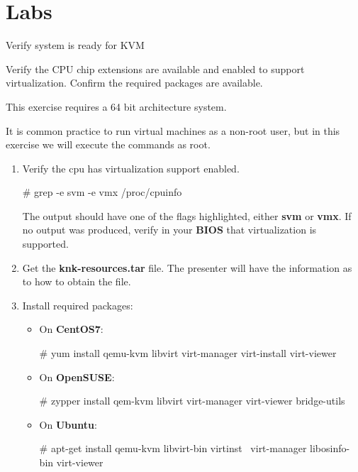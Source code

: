\clearpage\section{Labs}\begin{Lab}

\begin{exe} {Verify system is ready for KVM }

   Verify the CPU chip extensions are available and enabled to support virtualization. 
   Confirm the required packages are available. 

   This exercise requires a 64 bit architecture system.

   It is common practice to run virtual machines as a non-root user, but in this
   exercise we will execute the commands as root.

   \begin{sol}
      \begin{enumerate}
         \item	Verify the cpu has virtualization support enabled.
		 \begin{raw}
# grep -e svm -e vmx /proc/cpuinfo 
		\end{raw} 
		      The output should have one of the flags highlighted, either 
		      \textbf{svm} or \textbf{vmx}. If no output was produced, verify 
		      in your \textbf{BIOS} that virtualization is supported. 
		  
	\item Get the \textbf{knk-resources.tar} file. The presenter will 
		have the information as to how to obtain the file. 
	  \item Install required packages:		      
         \begin{itemize}
            \item
            On \textbf{CentOS7}:
            \begin{raw}
# yum install qemu-kvm libvirt virt-manager virt-install virt-viewer 
	    \end{raw}
            \item
            On \textbf{OpenSUSE}:
            \begin{raw}
# zypper install qem-kvm libvirt virt-manager virt-viewer bridge-utils 
            \end{raw}
            \item
            On \textbf{Ubuntu}:
            \begin{raw}
# apt-get install qemu-kvm libvirt-bin virtinst \
		    virt-manager libosinfo-bin virt-viewer 
            \end{raw}
         \end{itemize}


\end{enumerate}
\end{sol}
\end{exe}
\end{Lab}
